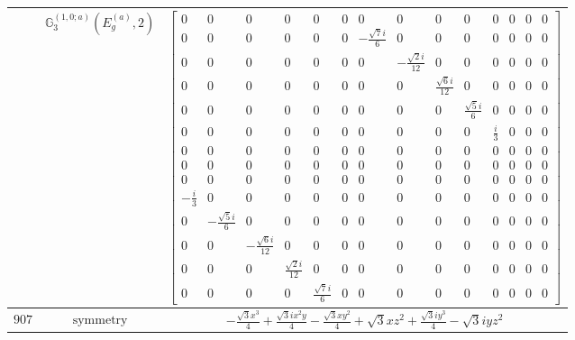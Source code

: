 \documentclass[fleqn,8pt,landscape]{jsarticle}
\begin{document}
\begin{longtable}{ccc}
$  $ & $ \mathbb{G}_{3}^{(1,0;a)}(E_{g}^{(a)},2) $ & $ \begin{bmatrix} 0 & 0 & 0 & 0 & 0 & 0 & 0 & 0 & 0 & 0 & 0 & 0 & 0 & 0 \\ 0 & 0 & 0 & 0 & 0 & 0 & - \frac{\sqrt{7} i}{6} & 0 & 0 & 0 & 0 & 0 & 0 & 0 \\ 0 & 0 & 0 & 0 & 0 & 0 & 0 & - \frac{\sqrt{2} i}{12} & 0 & 0 & 0 & 0 & 0 & 0 \\ 0 & 0 & 0 & 0 & 0 & 0 & 0 & 0 & \frac{\sqrt{6} i}{12} & 0 & 0 & 0 & 0 & 0 \\ 0 & 0 & 0 & 0 & 0 & 0 & 0 & 0 & 0 & \frac{\sqrt{5} i}{6} & 0 & 0 & 0 & 0 \\ 0 & 0 & 0 & 0 & 0 & 0 & 0 & 0 & 0 & 0 & \frac{i}{3} & 0 & 0 & 0 \\ 0 & 0 & 0 & 0 & 0 & 0 & 0 & 0 & 0 & 0 & 0 & 0 & 0 & 0 \\ 0 & 0 & 0 & 0 & 0 & 0 & 0 & 0 & 0 & 0 & 0 & 0 & 0 & 0 \\ 0 & 0 & 0 & 0 & 0 & 0 & 0 & 0 & 0 & 0 & 0 & 0 & 0 & 0 \\ - \frac{i}{3} & 0 & 0 & 0 & 0 & 0 & 0 & 0 & 0 & 0 & 0 & 0 & 0 & 0 \\ 0 & - \frac{\sqrt{5} i}{6} & 0 & 0 & 0 & 0 & 0 & 0 & 0 & 0 & 0 & 0 & 0 & 0 \\ 0 & 0 & - \frac{\sqrt{6} i}{12} & 0 & 0 & 0 & 0 & 0 & 0 & 0 & 0 & 0 & 0 & 0 \\ 0 & 0 & 0 & \frac{\sqrt{2} i}{12} & 0 & 0 & 0 & 0 & 0 & 0 & 0 & 0 & 0 & 0 \\ 0 & 0 & 0 & 0 & \frac{\sqrt{7} i}{6} & 0 & 0 & 0 & 0 & 0 & 0 & 0 & 0 & 0 \end{bmatrix} $ \\ \hline
$ 907 $ & $ \text{symmetry} $ & $ - \frac{\sqrt{3} x^{3}}{4} + \frac{\sqrt{3} i x^{2} y}{4} - \frac{\sqrt{3} x y^{2}}{4} + \sqrt{3} x z^{2} + \frac{\sqrt{3} i y^{3}}{4} - \sqrt{3} i y z^{2} $ \\

\end{longtable}
\end{document}
